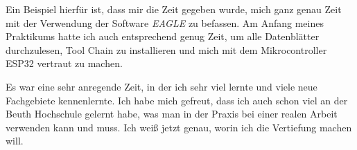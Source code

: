 Ein Beispiel hierfür ist, dass mir die Zeit gegeben wurde, mich ganz genau Zeit mit der Verwendung der Software \textit{EAGLE} zu befassen. Am Anfang meines Praktikums hatte ich auch entsprechend genug Zeit, um alle Datenblätter durchzulesen, Tool Chain zu installieren und mich mit dem Mikrocontroller ESP32 vertraut zu machen. 
 
Es war eine sehr anregende Zeit, in der ich sehr viel lernte und viele neue Fachgebiete kennenlernte. Ich habe mich gefreut, dass ich auch schon viel an der Beuth Hochschule gelernt habe, was man in der Praxis bei einer realen Arbeit verwenden kann und muss. Ich weiß jetzt genau, worin ich die Vertiefung machen will. 
